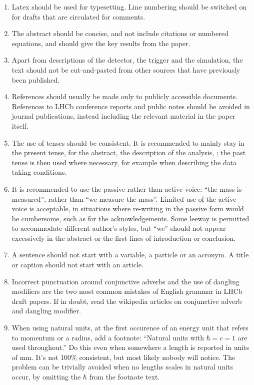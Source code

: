 \begin{enumerate}
\item Latex should be used for typesetting. Line numbering should be
  switched on for drafts that are circulated for comments.

\item The abstract should be concise, and not include citations or
  numbered equations, and should give the key results from the paper.

\item Apart from descriptions of the detector, the trigger and the
  simulation, the text should not be cut-and-pasted from other sources
  that have previously been published.

\item References should usually be made only to publicly accessible
  documents. References to LHCb conference reports and public notes
  should be avoided in journal publications, instead including the
  relevant material in the paper itself.

\item The use of tenses should be consistent. It is recommended to
  mainly stay in the present tense, for the abstract, the description
  of the analysis, \etc; the past tense is then used where necessary,
  for example when describing the data taking conditions.

\item It is recommended to use the passive rather than active voice:
  ``the mass is measured'', rather than ``we measure the mass''.
  Limited use of the active voice is acceptable, in situations where
  re-writing in the passive form would be cumbersome, such as for the
  acknowledgements.  Some leeway is permitted to accommodate different
  author's styles, but ``we'' should not appear excessively in the
  abstract or the first lines of introduction or conclusion.

\item A sentence should not start with a variable, a particle or an acronym.
 A title or caption should not start with an article. 

\item Incorrect punctuation around conjunctive adverbs and the use of 
dangling modifiers are the two most common mistakes of English grammar
in LHCb draft papers. If in doubt, read the wikipedia articles on 
conjunctive adverb and dangling modifier.  

\item When using natural units, at the first occurence of an energy unit
      that refers to momentum or a radius, add a footnote: ``Natural units
      with $\hbar=c=1$ are used throughout.'' Do this even when somewhere
      a length is reported in units of mm. It's not 100\% consistent, but
      most likely nobody will notice. The problem can be trivially avoided
      when no lengths scales in natural units occur, by omitting the 
      $\hbar$ from the footnote text.


\end{enumerate}

